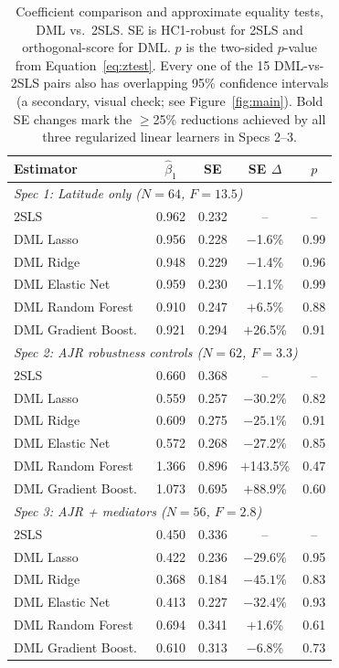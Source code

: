 \documentclass[10pt,twocolumn]{article}
\begin{document}
\begin{table}[t]
\centering
\scriptsize
\begin{tabular}{lcccc}
\toprule
\textbf{Estimator} & $\hat\beta_1$ & \textbf{SE} & \textbf{SE $\Delta$} & \textbf{$p$} \\
\midrule
\multicolumn{5}{l}{\textit{Spec 1: Latitude only ($N{=}64$, $F{=}13.5$)}} \\
\midrule
2SLS               & 0.962 & 0.232 & --      & --    \\
DML Lasso          & 0.956 & 0.228 & $-$1.6\%  & 0.99 \\
DML Ridge          & 0.948 & 0.229 & $-$1.4\%  & 0.96 \\
DML Elastic Net    & 0.959 & 0.230 & $-$1.1\%  & 0.99 \\
DML Random Forest  & 0.910 & 0.247 & $+$6.5\%  & 0.88 \\
DML Gradient Boost.\ & 0.921 & 0.294 & $+$26.5\% & 0.91 \\
\midrule
\multicolumn{5}{l}{\textit{Spec 2: AJR robustness controls ($N{=}62$, $F{=}3.3$)}} \\
\midrule
2SLS               & 0.660 & 0.368 & --      & --    \\
DML Lasso          & 0.559 & 0.257 & $\mathbf{-30.2\%}$ & 0.82 \\
DML Ridge          & 0.609 & 0.275 & $\mathbf{-25.1\%}$ & 0.91 \\
DML Elastic Net    & 0.572 & 0.268 & $\mathbf{-27.2\%}$ & 0.85 \\
DML Random Forest  & 1.366 & 0.896 & $+$143.5\% & 0.47 \\
DML Gradient Boost.\ & 1.073 & 0.695 & $+$88.9\% & 0.60 \\
\midrule
\multicolumn{5}{l}{\textit{Spec 3: AJR + mediators ($N{=}56$, $F{=}2.8$)}} \\
\midrule
2SLS               & 0.450 & 0.336 & --      & --    \\
DML Lasso          & 0.422 & 0.236 & $\mathbf{-29.6\%}$ & 0.95 \\
DML Ridge          & 0.368 & 0.184 & $\mathbf{-45.1\%}$ & 0.83 \\
DML Elastic Net    & 0.413 & 0.227 & $\mathbf{-32.4\%}$ & 0.93 \\
DML Random Forest  & 0.694 & 0.341 & $+$1.6\%  & 0.61 \\
DML Gradient Boost.\ & 0.610 & 0.313 & $-$6.8\%  & 0.73 \\
\bottomrule
\end{tabular}
\caption{Coefficient comparison and approximate equality tests, DML
vs.\ 2SLS. SE is HC1-robust for 2SLS and orthogonal-score for DML. $p$
is the two-sided $p$-value from Equation~\ref{eq:ztest}. Every one of
the 15 DML-vs-2SLS pairs also has overlapping 95\% confidence intervals
(a secondary, visual check; see Figure~\ref{fig:main}). Bold SE changes
mark the $\geq$25\% reductions achieved by all three regularized linear
learners in Specs 2--3.}
\label{tab:main}
\end{table}
\end{document}
